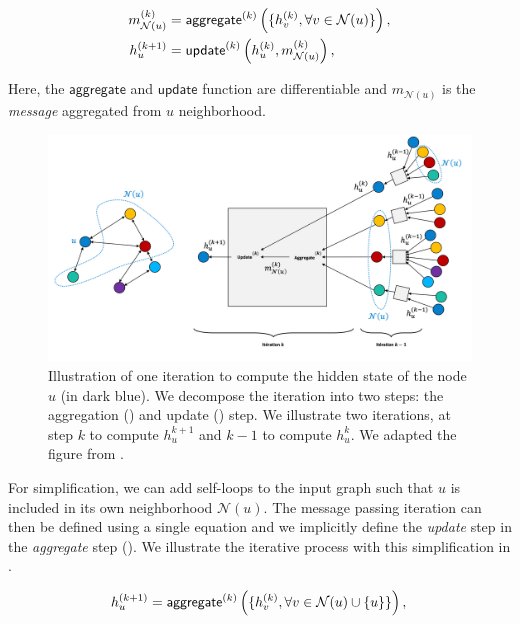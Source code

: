 \begin{align}
    m^{(k)}_{\mathcal{N}(u)} &= \mathsf{aggregate}^{(k)}\left(\{h_v^{(k)}, \forall v \in \mathcal{N}(u)\}\right), \labeq{aggregate} \\
    h^{(k+1)}_u &= \mathsf{update}^{(k)}\left(h^{(k)}_u, m^{(k)}_{\mathcal{N}(u)}\right), \labeq{update}
\end{align}

Here, the $\mathsf{aggregate}$ and $\mathsf{update}$ function are differentiable and $m_{\mathcal{N}(u)}$ is the \textit{message} aggregated from $u$ neighborhood. 

\begin{figure}[!htb]
\begin{center}
\includegraphics[width=16cm]{images/graph_update_5.png}
\end{center}
\caption{Illustration of one iteration to compute the hidden state of the node $u$ (in dark blue). We decompose the iteration into two steps: the aggregation () and update () step. We illustrate two iterations, at step $k$ to compute $h_u^{k+1}$ and $k-1$ to compute $h_u^{k}$. We adapted the figure from \textcite{hamilton_2020}.}
\end{figure}

For simplification, we can add self-loops to the input graph such that $u$ is included in its own neighborhood $\mathcal{N}(u)$. 
The message passing iteration can then be defined using a single equation and we implicitly define the \textit{update} step in the \textit{aggregate} step (). We illustrate the iterative process with this simplification in . 

\begin{equation}
    h^{(k+1)}_u = \mathsf{aggregate}^{(k)}\left(\{h_v^{(k)}, \forall v \in \mathcal{N}(u) \cup \{u\}\}\right), \labeq{update-aggregate}\\
\end{equation}

